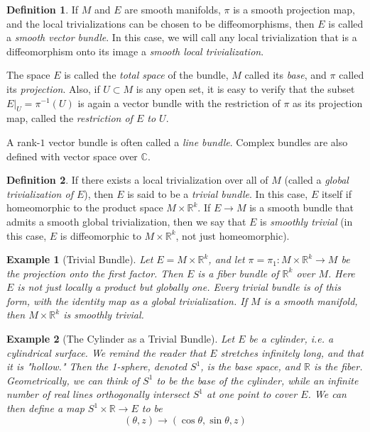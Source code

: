 \documentclass{article}
\newtheorem{example}{Example}[section]
\theoremstyle{remark}
\theoremstyle{definition}
\newtheorem{definition}{Definition}[section]
\begin{document}
\begin{definition}
If $M$ and $E$ are smooth manifolds, $\pi$ is a smooth projection map, and the local trivializations can be chosen to be diffeomorphisms, then $E$ is called a \textit{smooth vector bundle}. In this case, we will call any local trivialization that is a diffeomorphism onto its image a \textit{smooth local trivialization}. 

The space $E$ is called the \textit{total space} of the bundle, $M$ called its \textit{base}, and $\pi$ called its \textit{projection}. Also, if $U \subset M$ is any open set, it is easy to verify that the subset $E |_U = \pi^{-1} (U)$ is again a vector bundle with the restriction of $\pi$ as its projection map, called the \textit{restriction of $E$ to $U$}. 
\end{definition}

A rank-$1$ vector bundle is often called a \textit{line bundle}. Complex bundles are also defined with vector space over $\mathbb{C}$. 

\begin{definition}
If there exists a local trivialization over all of $M$ (called a \textit{global trivialization of $E$}), then $E$ is said to be a \textit{trivial bundle}. In this case, $E$ itself if homeomorphic to the product space $M \times \mathbb{R}^k$. If $E \longrightarrow M$ is a smooth bundle that admits a smooth global trivialization, then we say that $E$ is \textit{smoothly trivial} (in this case, $E$ is diffeomorphic to $M \times \mathbb{R}^k$, not just homeomorphic). 
\end{definition}

\begin{example}[Trivial Bundle]
Let $E = M \times \mathbb{R}^k$, and let $\pi = \pi_1: M \times \mathbb{R}^k \longrightarrow M$ be the projection onto the first factor. Then $E$ is a fiber bundle of $\mathbb{R}^k$ over $M$. Here $E$ is not just locally a product but \textit{globally} one. Every trivial bundle is of this form, with the identity map as a global trivialization. If $M$ is a smooth manifold, then $M \times \mathbb{R}^k$ is smoothly trivial. 
\end{example}

\begin{example}[The Cylinder as a Trivial Bundle]
Let $E$ be a cylinder, i.e. a cylindrical surface. We remind the reader that $E$ stretches infinitely long, and that it is "hollow." Then the 1-sphere, denoted $S^1$, is the base space, and $\mathbb{R}$ is the fiber. Geometrically, we can think of $S^1$ to be the base of the cylinder, while an infinite number of real lines orthogonally intersect $S^1$ at one point to cover $E$. We can then define a map $ S^1 \times \mathbb{R} \longrightarrow E$ to be 
\[ (\theta, z) \longrightarrow (\cos{\theta}, \sin{\theta}, z) \]
\end{example}
\end{document}
